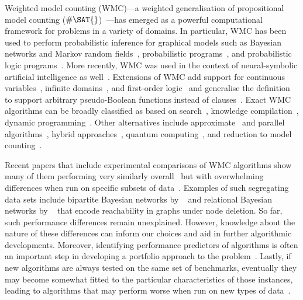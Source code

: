 \documentclass{article}
\theoremstyle{definition}
\begin{document}
Weighted model counting (\textsf{WMC})---a weighted generalisation of
propositional model counting
($\#\SAT{}$)~\cite{DBLP:journals/ai/ChaviraD08}---has emerged as a powerful
computational framework for problems in a variety of domains. In particular,
\textsf{WMC} has been used to perform probabilistic inference for graphical
models such as Bayesian networks and Markov random
fields~\cite{DBLP:conf/ecai/BartKLM16,DBLP:conf/ijcai/ChaviraD05,DBLP:conf/sat/ChaviraD06,DBLP:conf/kr/Darwiche02,DBLP:conf/aaai/SangBK05},
probabilistic programs~\cite{DBLP:journals/pacmpl/HoltzenBM20}, and
probabilistic logic programs~\cite{DBLP:journals/tplp/FierensBRSGTJR15}. More
recently, \textsf{WMC} was used in the context of neural-symbolic artificial
intelligence as well~\cite{DBLP:conf/icml/XuZFLB18}. Extensions of \textsf{WMC}
add support for continuous variables~\cite{DBLP:conf/ijcai/BellePB15}, infinite
domains~\cite{DBLP:conf/aaai/Belle17}, and first-order
logic~\cite{DBLP:conf/ijcai/BroeckTMDR11,DBLP:journals/cacm/GogateD16} and
generalise the definition to support arbitrary pseudo-Boolean functions instead
of clauses~\cite{DBLP:conf/sat/DilkasB21}.
Exact \textsf{WMC} algorithms can be broadly classified as based on
search~\cite{DBLP:conf/sat/SangBBKP04,DBLP:conf/ijcai/SharmaRSM19}, knowledge
compilation~\cite{DBLP:conf/ecai/Darwiche04,DBLP:conf/ijcai/LagniezM17,DBLP:conf/ijcai/OztokD15},
dynamic programming~\cite{DBLP:conf/aaai/DudekPV20,DBLP:conf/cp/DudekPV20}. Other alternatives include approximate~\cite{DBLP:conf/aaai/RenkensKBR14} and parallel algorithms~\cite{DBLP:conf/pgm/DalLL18,DBLP:conf/esa/FichteHWZ18}, hybrid approaches~\cite{DBLP:conf/sat/HecherTW20}, quantum computing~\cite{DBLP:conf/ecai/Riguzzi20}, and reduction to model counting~\cite{DBLP:conf/ijcai/ChakrabortyFMV15}.

Recent papers that include experimental comparisons of \textsf{WMC}
algorithms show many of them performing very similarly
overall~\cite{DBLP:conf/aaai/DudekPV20,DBLP:conf/cp/DudekPV20} but with
overwhelming differences when run on specific subsets of
data~\cite{DBLP:conf/uai/DilkasB21,DBLP:conf/sat/DilkasB21,DBLP:conf/ijcai/LagniezM17}.
Examples of such segregating data sets include bipartite Bayesian networks by
\citeauthor{DBLP:conf/aaai/SangBK05}~ and
relational Bayesian networks by
\citeauthor{DBLP:journals/ijar/ChaviraDJ06}~
that encode reachability in graphs under node deletion. So far, such performance
differences remain unexplained. However, knowledge about the nature of these
differences can inform our choices and aid in further algorithmic developments.
Moreover, identifying performance predictors of algorithms is often an important
step in developing a portfolio approach to the
problem~\cite{DBLP:journals/jair/XuHHL08}. Lastly, if new algorithms are always
tested on the same set of benchmarks, eventually they may become somewhat fitted
to the particular characteristics of those instances, leading to algorithms that
may perform worse when run on new types of
data~\cite{DBLP:conf/cec/HossainALA10}.
\end{document}

